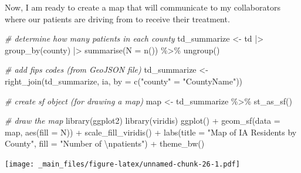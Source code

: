 \documentclass[
]{book}
\newenvironment{Shaded}{\begin{snugshade}}{\end{snugshade}}
\newcommand{\AttributeTok}[1]{\textcolor[rgb]{0.77,0.63,0.00}{#1}}
\newcommand{\CommentTok}[1]{\textcolor[rgb]{0.56,0.35,0.01}{\textit{#1}}}
\newcommand{\FunctionTok}[1]{\textcolor[rgb]{0.00,0.00,0.00}{#1}}
\newcommand{\NormalTok}[1]{#1}
\newcommand{\OtherTok}[1]{\textcolor[rgb]{0.56,0.35,0.01}{#1}}
\newcommand{\SpecialCharTok}[1]{\textcolor[rgb]{0.00,0.00,0.00}{#1}}
\newcommand{\StringTok}[1]{\textcolor[rgb]{0.31,0.60,0.02}{#1}}
\begin{document}
Now, I am ready to create a map that will communicate to my collaborators where our patients are driving from to receive their treatment.

\begin{Shaded}
\begin{Highlighting}[]
\CommentTok{\# determine how many patients in each county}
\NormalTok{td\_summarize }\OtherTok{\textless{}{-}}\NormalTok{ td }\SpecialCharTok{|\textgreater{}}
    \FunctionTok{group\_by}\NormalTok{(county) }\SpecialCharTok{|\textgreater{}}
    \FunctionTok{summarise}\NormalTok{(}\AttributeTok{N =} \FunctionTok{n}\NormalTok{()) }\SpecialCharTok{\%\textgreater{}\%}
  \FunctionTok{ungroup}\NormalTok{()}

\CommentTok{\# add fips codes (from GeoJSON file)}
\NormalTok{td\_summarize }\OtherTok{\textless{}{-}} \FunctionTok{right\_join}\NormalTok{(td\_summarize, ia,}
            \AttributeTok{by =} \FunctionTok{c}\NormalTok{(}\StringTok{"county"} \OtherTok{=} \StringTok{"CountyName"}\NormalTok{)) }

\CommentTok{\# create sf object (for drawing a map)}
\NormalTok{map }\OtherTok{\textless{}{-}}\NormalTok{ td\_summarize }\SpecialCharTok{\%\textgreater{}\%}
  \FunctionTok{st\_as\_sf}\NormalTok{()}

\CommentTok{\# draw the map }
\FunctionTok{library}\NormalTok{(ggplot2)}
\FunctionTok{library}\NormalTok{(viridis)}
\FunctionTok{ggplot}\NormalTok{() }\SpecialCharTok{+} 
  \FunctionTok{geom\_sf}\NormalTok{(}\AttributeTok{data =}\NormalTok{ map,}
          \FunctionTok{aes}\NormalTok{(}\AttributeTok{fill =}\NormalTok{ N)) }\SpecialCharTok{+} 
  \FunctionTok{scale\_fill\_viridis}\NormalTok{() }\SpecialCharTok{+} 
  \FunctionTok{labs}\NormalTok{(}\AttributeTok{title =} \StringTok{"Map of IA Residents by County"}\NormalTok{, }\AttributeTok{fill =} \StringTok{"Number of }\SpecialCharTok{\textbackslash{}n}\StringTok{patients"}\NormalTok{) }\SpecialCharTok{+}
  \FunctionTok{theme\_bw}\NormalTok{() }
\end{Highlighting}
\end{Shaded}

\texttt{[image: \_main\_files/figure-latex/unnamed-chunk-26-1.pdf]}

  
\end{document}
